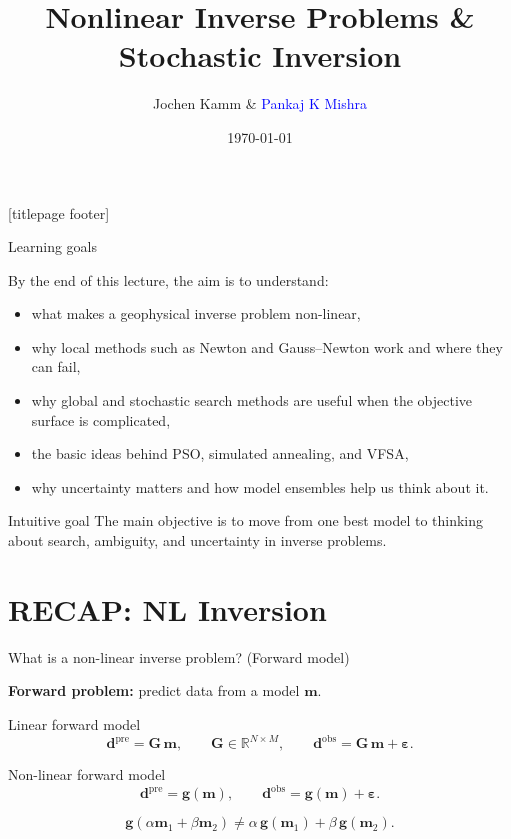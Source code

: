 \documentclass[aspectratio=169]{beamer}
\title{\LARGE\textbf{Nonlinear Inverse Problems \& Stochastic Inversion}}
\author{Jochen Kamm \& \textcolor{blue}{Pankaj K Mishra}}
\date{\footnotesize\today}
\newcommand{\mat}[1]{{\mathbf{#1}}}
\renewcommand{\vec}[1]{\mathbf{#1}}
\newcommand{\dobs}{{\vec{d}^{\text{obs}}}}
\newcommand{\dpre}{{\vec{d}^{\text{pre}}}}
\newcommand{\mm}{ {\vec{m}} }
\renewcommand{\gg}[1]{\vec{g}\left(#1\right)}
\newcommand{\GG}{\mat{G}}
\begin{document}
{
[titlepage footer]
\begin{frame}[plain]
    \titlepage
\end{frame}
}

\begin{frame}{Learning goals}
\small

By the end of this lecture, the aim is to understand:

\begin{itemize}
    \item[--] what makes a geophysical inverse problem non-linear,
    \item[--] why local methods such as Newton and Gauss--Newton work and where they can fail,
    \item[--] why global and stochastic search methods are useful when the objective surface is complicated,
    \item[--] the basic ideas behind PSO, simulated annealing, and VFSA,
    \item[--] why uncertainty matters and how model ensembles help us think about it.
\end{itemize}

\begin{alertblock}{Intuitive goal}
The main objective is to move from \alert{one best model} to \alert{thinking about search, ambiguity, and uncertainty} in inverse problems.
\end{alertblock}
\end{frame}

\section{RECAP: NL Inversion}


\begin{frame}{What is a non-linear inverse problem? (Forward model)}
\small

\textbf{Forward problem:} predict data from a model $\mm$.

\vspace{0.2cm}

\begin{block}{Linear forward model }
\[
\dpre = \GG\,\mm,
\qquad
\GG\in\mathbb{R}^{N\times M},
\qquad
\dobs = \GG\,\mm + \boldsymbol\varepsilon .
\]
\end{block}

\vspace{0.15cm}

\begin{block}{Non-linear forward model}
\[
\dpre = \gg{\mm},
\qquad
\dobs = \gg{\mm} + \boldsymbol\varepsilon .
\]

\vspace{-0.1cm}
\[
\gg{\alpha\mm_1+\beta\mm_2}\neq \alpha\,\gg{\mm_1}+\beta\,\gg{\mm_2}.
\]
\end{block}

\end{frame}
\end{document}
